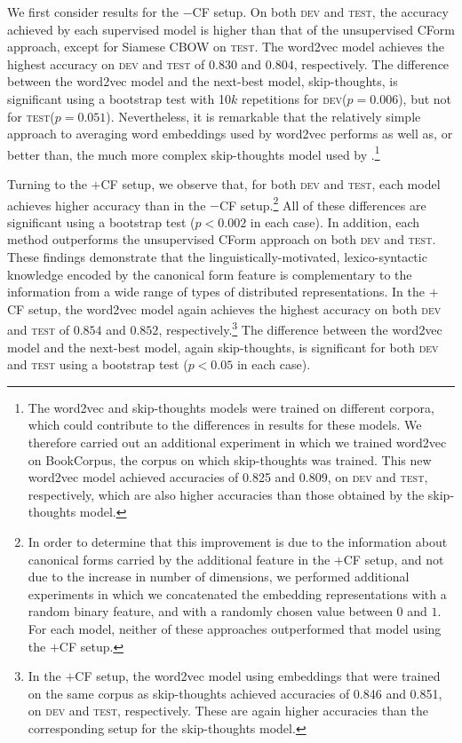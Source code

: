 \documentclass[11pt,a4paper]{article}
\newcommand{\dev}{\textsc{dev}\xspace}
\newcommand{\test}{\textsc{test}\xspace}
\begin{document}
We first consider results for the $-$CF setup. On both \dev and \test,
the accuracy achieved by each supervised model is higher than that of
the unsupervised CForm approach, except for Siamese CBOW on \test. The
word2vec model achieves the highest accuracy on \dev and \test of
$0.830$ and $0.804$, respectively. The difference between the word2vec
model and the next-best model, skip-thoughts, is significant using a
bootstrap test \cite{Berg-Kirkpatrick+:2012} with 10$k$ repetitions
for \dev ($p=0.006$), but not for \test ($p=0.051$). Nevertheless, it
is remarkable that the relatively simple approach to averaging word
embeddings used by word2vec performs as well as, or better than, the
much more complex skip-thoughts model used by
.\footnote{The word2vec and
  skip-thoughts models were trained on different corpora, which could
  contribute to the differences in results for these models. We
  therefore carried out an additional experiment in which we trained
  word2vec on BookCorpus, the corpus on which skip-thoughts was
  trained. This new word2vec model achieved accuracies of 0.825 and
  0.809, on \dev and \test, respectively, which are also higher
  accuracies than those obtained by the skip-thoughts model.}

Turning to the $+$CF setup, we observe that, for both \dev and \test,
each model achieves higher accuracy than in the $-$CF
setup.\footnote{In order to determine that this improvement is due to
  the information about canonical forms carried by the additional
  feature in the $+$CF setup, and not due to the increase in number of
  dimensions, we performed additional experiments in which we
  concatenated the embedding representations with a random binary
  feature, and with a randomly chosen value between $0$ and $1$. For
  each model, neither of these approaches outperformed that model
  using the $+$CF setup.}  All of these differences are significant
using a bootstrap test ($p<0.002$ in each case). In addition, each
method outperforms the unsupervised CForm approach on both \dev and
\test. These findings demonstrate that the linguistically-motivated,
lexico-syntactic knowledge encoded by the canonical form feature is
complementary to the information from a wide range of types of
distributed representations. In the $+$CF setup, the word2vec model
again achieves the highest accuracy on both \dev and \test of $0.854$
and $0.852$, respectively.\footnote{In the $+$CF setup, the word2vec
  model using embeddings that were trained on the same corpus as
  skip-thoughts achieved accuracies of 0.846 and 0.851, on \dev and
  \test, respectively. These are again higher accuracies than the
  corresponding setup for the skip-thoughts model.}  The difference
between the word2vec model and the next-best model, again
skip-thoughts, is significant for both \dev and \test using a
bootstrap test ($p<0.05$ in each case).
\end{document}
